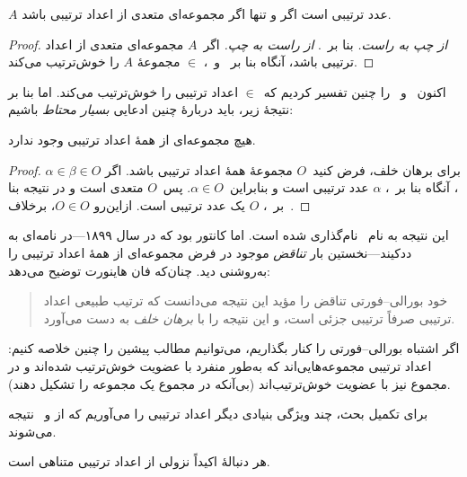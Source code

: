 \documentclass[../../../include/open-logic-section]{subfiles}
\begin{document}
\begin{cor}
$A$ عدد ترتیبی است اگر و تنها اگر مجموعه‌ای متعدی از اعداد ترتیبی باشد.
\end{cor}

\begin{proof}
\emph{از چپ به راست.} بنا بر~.
\emph{از راست به چپ.} اگر~$A$ مجموعه‌ای متعدی از اعداد ترتیبی باشد، آنگاه
بنا بر~ و~، $\in$ مجموعهٔ
$A$ را خوش‌ترتیب می‌کند.
\end{proof}

اکنون~ و~ را چنین تفسیر
کردیم که~$\in$ اعداد ترتیبی را خوش‌ترتیب می‌کند. اما بنا بر نتیجهٔ زیر،
باید دربارهٔ چنین ادعایی \emph{بسیار محتاط} باشیم:

\begin{thm}
هیچ مجموعه‌ای از همهٔ اعداد ترتیبی وجود ندارد.
\end{thm}

\begin{proof}
برای برهان خلف، فرض کنید~$O$ مجموعهٔ همهٔ اعداد ترتیبی باشد. اگر
$\alpha \in \beta \in O$، آنگاه بنا بر~، $\alpha$
عدد ترتیبی است و بنابراین~$\alpha \in O$. پس~$O$ متعدی است و در نتیجه
بنا بر~، $O$ یک عدد ترتیبی است. ازاین‌رو
$O \in O$، برخلاف~.
\end{proof}
\noindent
این نتیجه به نام~\citeauthor{Burali-Forti1897} نام‌گذاری شده است. اما
کانتور بود که در سال ۱۸۹۹---در نامه‌ای به ددکیند---نخستین بار
\emph{تناقض} موجود در فرض مجموعه‌ای از همهٔ اعداد ترتیبی را به‌روشنی دید.
چنان‌که فان هاینورت توضیح می‌دهد:
\begin{quote}
  خود بورالی--فورتی تناقض را مؤید این نتیجه می‌دانست که ترتیب طبیعی اعداد
  ترتیبی صرفاً ترتیبی جزئی است، و این نتیجه را با \emph{برهان خلف} به دست
  می‌آورد.
  \citep[p.~105]{Heijenoort1967}
\end{quote}
اگر اشتباه بورالی--فورتی را کنار بگذاریم، می‌توانیم مطالب پیشین را چنین
خلاصه کنیم: اعداد ترتیبی مجموعه‌هایی‌اند که به‌طور منفرد با عضویت
خوش‌ترتیب شده‌اند و در مجموع نیز با عضویت خوش‌ترتیب‌اند (بی‌آنکه در مجموع
یک مجموعه را تشکیل دهند).

برای تکمیل بحث، چند ویژگی بنیادی دیگر اعداد ترتیبی را می‌آوریم که از
 و~ نتیجه می‌شوند.

\begin{prop}
هر دنبالهٔ اکیداً نزولی از اعداد ترتیبی متناهی است.
\end{prop}
\end{document}
